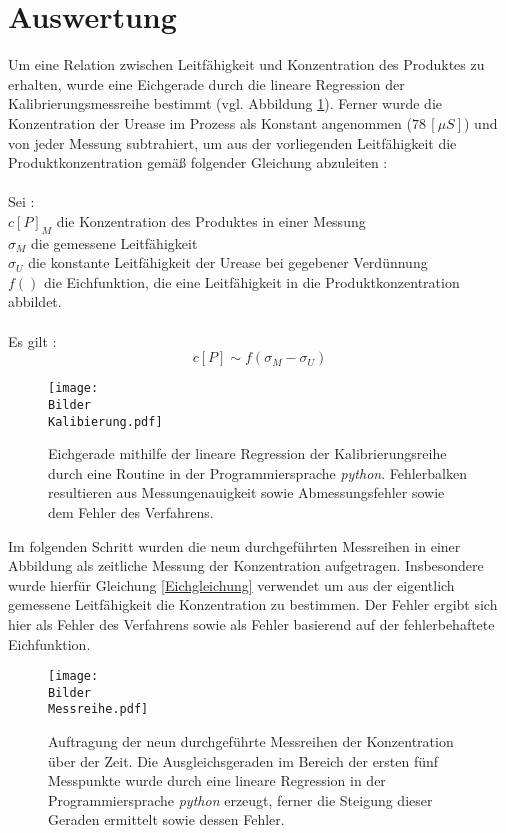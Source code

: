 


\section {Auswertung}
Um eine Relation zwischen Leitfähigkeit und Konzentration des Produktes zu erhalten, wurde eine Eichgerade durch die lineare Regression der Kalibrierungsmessreihe bestimmt (vgl. Abbildung \ref{Eichgerade}). Ferner wurde die Konzentration der Urease im Prozess als Konstant angenommen ($ 78\,[\si{\mu S}]$) und von jeder Messung subtrahiert, um aus der vorliegenden Leitfähigkeit die Produktkonzentration gemäß folgender Gleichung abzuleiten : \\
\\
Sei : \\
 $c[P]_M$ die Konzentration des Produktes in einer Messung\\
 $\sigma_M$ die gemessene Leitfähigkeit\\
  $\sigma_U$ die konstante Leitfähigkeit der Urease bei gegebener Verdünnung \\
  $f()$ die Eichfunktion, die eine Leitfähigkeit in die Produktkonzentration abbildet.\\
  \\
  Es gilt :
\begin{equation}
c[P]  \sim f(\sigma_M-\sigma_U)
\label{Eichgleichung}
\end{equation}
\begin{figure}[H]
	\centering	
	\begin{minipage}{1\textwidth}
		\texttt{[image: \\Bilder\\Kalibierung.pdf]}
	\end{minipage}
	\caption{Eichgerade mithilfe der lineare Regression der Kalibrierungsreihe durch eine Routine in der Programmiersprache \textit{python}. Fehlerbalken resultieren aus Messungenauigkeit sowie Abmessungsfehler sowie dem Fehler des Verfahrens.}
	\label{Eichgerade}
\end{figure}
Im folgenden Schritt wurden die neun durchgeführten Messreihen in einer Abbildung als zeitliche Messung der Konzentration aufgetragen. Insbesondere wurde hierfür Gleichung \ref{Eichgleichung} verwendet um aus der eigentlich gemessene Leitfähigkeit die Konzentration zu bestimmen. Der Fehler ergibt sich hier als Fehler des Verfahrens sowie als Fehler basierend auf der fehlerbehaftete Eichfunktion.
\newpage
\begin{figure}[H]
	\centering	
	\begin{minipage}{1\textwidth}
		\texttt{[image: \\Bilder\\Messreihe.pdf]}
	\end{minipage}
	\caption{Auftragung der neun durchgeführte Messreihen der Konzentration über der Zeit. Die Ausgleichsgeraden im Bereich der ersten fünf Messpunkte wurde durch eine lineare Regression in der Programmiersprache \textit{python} erzeugt, ferner die Steigung dieser Geraden ermittelt sowie dessen Fehler.}
	\label{Messreihe}
\end{figure}
